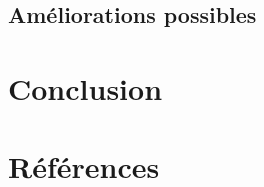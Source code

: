 \documentclass[a4paper, 12pt]{article}
\begin{document}

\subsection{Améliorations possibles}

\newpage

\section{Conclusion}

\newpage

\section{Références}
\nocite{*}


\end{document}
